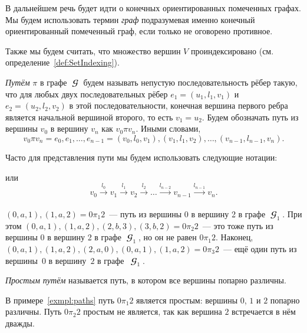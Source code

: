 В дальнейшем речь будет идти о конечных ориентированных помеченных графах.
Мы будем использовать термин \emph{граф} подразумевая именно конечный ориентированный помеченный граф, если только не оговорено противное.

Также мы будем считать, что множество вершин $V$ проиндексировано (см. определение~\ref{def:SetIndexing}).

\begin{definition}[Путь]
    \label{def:path}
    \emph{Путём} $\pi$ в графе $\mbfscrG$ будем называть непустую последовательность рёбер такую, что для любых двух последовательных рёбер $e_1 = (u_1, l_1, v_1)$ и $e_2 = (u_2, l_2, v_2)$ в этой последовательности, конечная вершина первого ребра является начальной вершиной второго, то есть $v_1 = u_2$.
    Будем обозначать путь из вершины $v_0$ в вершину $v_n$ как $v_0 \pi v_n$.
    Иными словами,
    \[v_0 \pi v_n = e_0,e_1, \dots, e_{n-1} = (v_0, l_0, v_1),(v_1,l_1,v_2),\dots,(v_{n-1},l_{n-1},v_n).\]
\end{definition}
Часто для представления пути мы будем использовать следующие нотации:
\begin{center}
    
\end{center}
или
\[
    v_0 \xrightarrow[]{l_0} v_1 \xrightarrow[]{l_1} v_2 \xrightarrow[]{l_2} \ldots \xrightarrow[]{l_{n-2}} v_{n-1} \xrightarrow[]{l_{n-1}} v_n.
\]

\begin{example}\label{exmpl:paths}
    $(0,a,1), (1,a,2) = 0 \pi_1 2$~--- путь из вершины 0 в вершину 2 в графе $\mbfscrG_1$.
    При этом $(0, a, 1), (1, a, 2), (2, b, 3), (3, b, 2) = 0 \pi_2 2$~--- это тоже путь из вершины 0 в вершину 2 в графе $\mbfscrG_1$, но он не равен $0 \pi_1 2$.
    Наконец, $(0,a,1),(1,a,2),(2,a,0),(0,a,1),(1,a,2) = 0 \pi_3 2$~--- ещё один путь из вершины~$0$ в вершину~$2$ в графе~$\mbfscrG_1$.
\end{example}

\begin{definition}
    \label{def:simple_path}
    \emph{Простым путём} называется путь, в котором все вершины попарно различны.
\end{definition}

\begin{example}
    В примере~\ref{exmpl:paths} путь $0 \pi_1 2$ является простым: вершины $0$, $1$ и $2$ попарно различны.
    Путь $0 \pi_2 2$ простым не является, так как вершина $2$ встречается в нём дважды.
\end{example}

